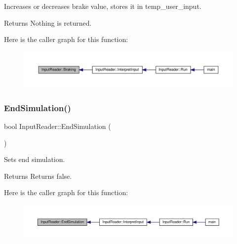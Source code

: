 Increases or decreases brake value, stores it in temp\+\_\+user\+\_\+input. \begin{DoxyReturn}{Returns}
Nothing is returned. 
\end{DoxyReturn}
Here is the caller graph for this function\+:
\nopagebreak
\begin{figure}[H]
\begin{center}
\leavevmode
\includegraphics[width=350pt]{classInputReader_ad35d36c2bac3f4b6bae2d2ad501873cb_icgraph}
\end{center}
\end{figure}
\mbox{\label{classInputReader_af314d9877257c41a41d937e3ca00c679}} 
\subsubsection{\texorpdfstring{End\+Simulation()}{EndSimulation()}}
{\footnotesize\ttfamily bool Input\+Reader\+::\+End\+Simulation (\begin{DoxyParamCaption}{ }\end{DoxyParamCaption})}

Sets end simulation. \begin{DoxyReturn}{Returns}
Returns false. 
\end{DoxyReturn}
Here is the caller graph for this function\+:
\nopagebreak
\begin{figure}[H]
\begin{center}
\leavevmode
\includegraphics[width=350pt]{classInputReader_af314d9877257c41a41d937e3ca00c679_icgraph}
\end{center}
\end{figure}
\mbox{\label{classInputReader_aec41f6307eb1f4ca8308d4f002ce1cf0}} 
